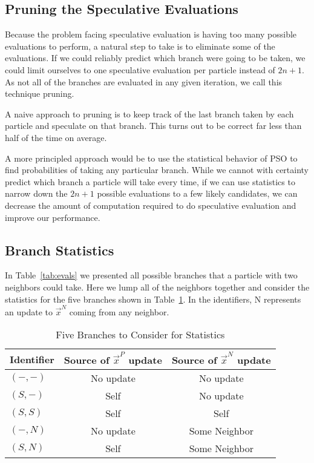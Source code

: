 \documentclass[smallcondensed]{svjour3}
\providecommand{\pers}{\ensuremath{P}}
\providecommand{\neigh}{\ensuremath{N}}
\providecommand{\nbest}{\ensuremath{\Vec{x}^\neigh}}
\providecommand{\pbest}{\ensuremath{\Vec{x}^\pers}}
\providecommand{\casexn}{\ensuremath{(S,-)}}
\providecommand{\casexx}{\ensuremath{(S,S)}}
\providecommand{\casepn}{\ensuremath{(-,-)}}
\providecommand{\casepN}{\ensuremath{(-,N)}}
\providecommand{\casexN}{\ensuremath{(S,N)}}
\begin{document}
\subsection{Pruning the Speculative Evaluations}
\label{sec:pruning}

Because the problem facing speculative evaluation is having too many possible
evaluations to perform, a natural step to take is to eliminate some of the
evaluations.  If we could reliably predict which branch were going to be taken,
we could limit ourselves to one speculative evaluation per particle instead of
$2n+1$.  As not all of the branches are evaluated in any given iteration, we
call this technique pruning.  

A naive approach to pruning is to keep track of the last branch taken by each
particle and speculate on that branch.  This turns out to be correct far less
than half of the time on average.

A more principled approach would be to use the statistical behavior of PSO to
find probabilities of taking any particular branch.  While we cannot with
certainty predict which branch a particle will take every time, if we can use
statistics to narrow down the $2n+1$ possible evaluations to a few likely
candidates, we can decrease the amount of computation required to do
speculative evaluation and improve our performance.

\subsection{Branch Statistics}
\label{sec:statistics}

In Table~\ref{tab:evals} we presented all possible branches that a particle
with two neighbors could take.  Here we lump all of the neighbors together and
consider the statistics for the five branches shown in
Table~\ref{tab:branches}.  In the identifiers, N represents an update to
$\nbest$ coming from any neighbor.

\begin{table}[ht]
  \caption{Five Branches to Consider for Statistics}
  \label{tab:branches}
  \centering
  \begin{tabular}{lcc}
	Identifier&Source of $\pbest$ update&Source of $\nbest$ update\\
	\hline
	\hline
	$\casepn$&No update&No update\\
	\hline
	$\casexn$&Self&No update\\
	\hline
	$\casexx$&Self&Self\\
	\hline
	$\casepN$&No update&Some Neighbor\\
	\hline
	$\casexN$&Self&Some Neighbor\\
	\hline
  \end{tabular}
\end{table}
\end{document}
